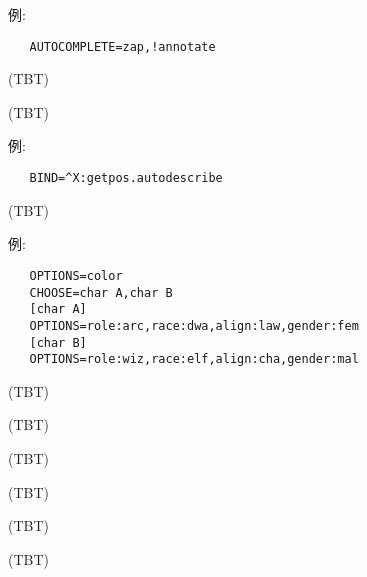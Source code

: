 例:
\begin{verbatim}
   AUTOCOMPLETE=zap,!annotate
\end{verbatim}

\item[\bb{AUTOPICKUP\_EXCEPTION}]
(TBT)
\item[\bb{BINDINGS}]
(TBT)

例:
\begin{verbatim}
   BIND=^X:getpos.autodescribe
\end{verbatim}

\item[\bb{CHOOSE}]
(TBT)

例:
\begin{verbatim}
   OPTIONS=color
   CHOOSE=char A,char B
   [char A]
   OPTIONS=role:arc,race:dwa,align:law,gender:fem
   [char B]
   OPTIONS=role:wiz,race:elf,align:cha,gender:mal
\end{verbatim}

\item[\bb{MENUCOLOR}]
(TBT)
\item[\bb{MSGTYPE}]
(TBT)
\item[\bb{ROGUESYMBOLS}]
(TBT)
\item[\bb{SOUND}]
(TBT)
\item[\bb{SOUNDDIR}]
(TBT)
\item[\bb{SYMBOLS}]
(TBT)

